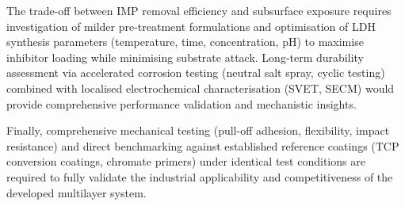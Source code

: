 \documentclass[11pt,twoside,a4paper,final]{report}
\begin{document}
The trade-off between IMP removal efficiency and subsurface exposure requires investigation of milder pre-treatment formulations and optimisation of LDH synthesis parameters (temperature, time, concentration, pH) to maximise inhibitor loading while minimising substrate attack. Long-term durability assessment via accelerated corrosion testing (neutral salt spray, cyclic testing) combined with localised electrochemical characterisation (SVET, SECM) would provide comprehensive performance validation and mechanistic insights.

Finally, comprehensive mechanical testing (pull-off adhesion, flexibility, impact resistance) and direct benchmarking against established reference coatings (TCP conversion coatings, chromate primers) under identical test conditions are required to fully validate the industrial applicability and competitiveness of the developed multilayer system.






 
\end{document}
